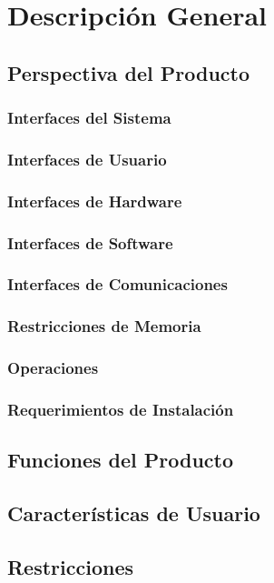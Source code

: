 \documentclass[10pt,a4paper,english,spanish]{article}
\begin{document}
\section{Descripción General}
\label{section-desc-gral}

\subsection{Perspectiva del Producto}
	\subsubsection{Interfaces del Sistema}
	\subsubsection{Interfaces de Usuario}
	\subsubsection{Interfaces de Hardware}
	\subsubsection{Interfaces de Software}
	\subsubsection{Interfaces de Comunicaciones}
	\subsubsection{Restricciones de Memoria}	
	\subsubsection{Operaciones}
	\subsubsection{Requerimientos de Instalación}
\subsection{Funciones del Producto}
\subsection{Características de Usuario}
\subsection{Restricciones}
\end{document}

